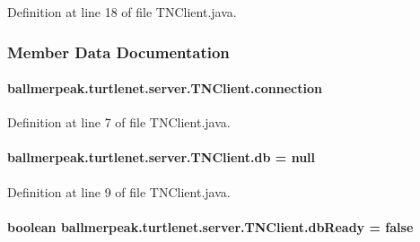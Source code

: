 Definition at line 18 of file T\-N\-Client.\-java.



\subsubsection{Member Data Documentation}
\hypertarget{classballmerpeak_1_1turtlenet_1_1server_1_1TNClient_a5f3a2db779658358496e57ddc06ca612}{
\paragraph[{connection}]{ ballmerpeak.\-turtlenet.\-server.\-T\-N\-Client.\-connection}}\label{classballmerpeak_1_1turtlenet_1_1server_1_1TNClient_a5f3a2db779658358496e57ddc06ca612}


Definition at line 7 of file T\-N\-Client.\-java.

\hypertarget{classballmerpeak_1_1turtlenet_1_1server_1_1TNClient_a71515570b30a73fbd91017c811dad2ba}{
\paragraph[{db}]{ ballmerpeak.\-turtlenet.\-server.\-T\-N\-Client.\-db = null}}\label{classballmerpeak_1_1turtlenet_1_1server_1_1TNClient_a71515570b30a73fbd91017c811dad2ba}


Definition at line 9 of file T\-N\-Client.\-java.

\hypertarget{classballmerpeak_1_1turtlenet_1_1server_1_1TNClient_aec7ed1884c5ebaaff15d83de15086ef2}{
\paragraph[{db\-Ready}]{\setlength{\rightskip}{0pt plus 5cm}boolean ballmerpeak.\-turtlenet.\-server.\-T\-N\-Client.\-db\-Ready = false}}\label{classballmerpeak_1_1turtlenet_1_1server_1_1TNClient_aec7ed1884c5ebaaff15d83de15086ef2}


